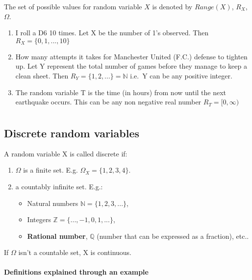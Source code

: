 \documentclass[
  letterpaper,
  DIV=11,
  numbers=noendperiod]{scrreprt}
\begin{document}
The set of possible values for random variable \(X\) is denoted by
\(Range(X)\), \(R_X\), \(\Omega\).

\begin{enumerate}
\def\labelenumi{\arabic{enumi}.}
\item
  I roll a D6 10 times. Let X be the number of 1's observed. Then
  \(R_X = \{0, 1, ..., 10\}\)
\item
  How many attempts it takes for Manchester United (F.C.) defense to
  tighten up. Let Y represent the total number of games before they
  manage to keep a clean sheet. Then
  \(R_Y = \{ 1,2, ...\} = \mathbb{N}\) i.e.~Y can be any positive
  integer.
\item
  The random variable T is the time (in hours) from now until the next
  earthquake occurs. This can be any non negative real number
  \(R_T = [0, \infty)\)
\end{enumerate}

\part{}

\chapter{Discrete random variables}\label{discrete-random-variables}

A random variable X is called discrete if:

\begin{enumerate}
\def\labelenumi{\arabic{enumi}.}
\item
  \(\Omega\) is a finite set. E.g. \(\Omega_X = \{1, 2, 3, 4\}\).
\item
  a countably infinite set. E.g.:

  \begin{itemize}
  \item
    Natural numbers \(\mathbb{N} = \{1, 2, 3, ...\}\),
  \item
    Integers \(\mathbb{Z} = \{..., -1, 0, 1,...\}\),
  \item
    \textbf{Rational number}, \(\mathbb{Q}\) (number that can be
    expressed as a fraction), etc..
  \end{itemize}
\end{enumerate}

If \(\Omega\) isn't a countable set, X is continuous.

\subsection{Definitions explained through an
example}\label{definitions-explained-through-an-example}
\end{document}
